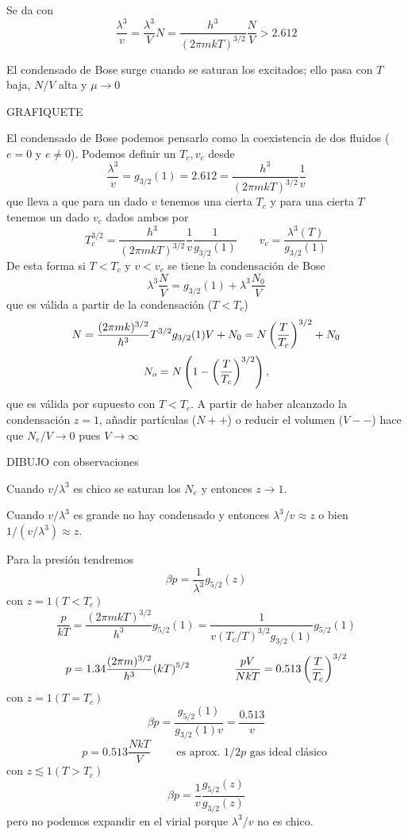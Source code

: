 \documentclass[10pt,oneside]{CBFT_book}
\begin{document}
Se da con 
\[
	\frac{\lambda^3}{v} = \frac{\lambda^3}{V} N = \frac{h^3}{(2\pi m kT)^{3/2}} \frac{N}{V} > 2.612
\]

El condensado de Bose surge cuando se saturan los excitados; ello pasa con $T$ baja, $N/V$
alta y $ \mu \to 0$

GRAFIQUETE

El condensado de Bose podemos pensarlo como la coexistencia de dos fluidos ($e=0$ y $e\neq 0$).
Podemos definir un $ T_c, v_c $ desde 
\[
	\frac{\lambda^3}{v} = g_{3/2}(1) = 2.612 = \frac{h^3}{(2 \pi m k T)^{3/2}} \frac{1}{v}
\]
que lleva a que para un dado $v$ tenemos una cierta $T_c$ y para una cierta $T$ tenemos un 
dado $v_c$ dados ambos por 
\[
	T_c^{3/2} = \frac{h^3}{(2 \pi m k T)^{3/2}} \frac{1}{v} \frac{1}{g_{3/2}(1)} \qquad 
	v_c = \frac{\lambda^3(T)}{g_{3/2}(1)}
\]
De esta forma si $ T<T_c$ y $v<v_c$ se tiene la condensación de Bose
\[
	\lambda^3\frac{N}{V} = g_{3/2}(1) + \lambda^3\frac{N_0}{V}
\]
que es válida a partir de la condensación ($T<T_c$)
\[
	N =  \frac{(2 \pi m k )^{3/2}}{h^3} T^{3/2} g_{3/2}(1)  V + N_0 = N \left( \frac{ T }{ T_c } \right)^{3/2} + N_0
\]
\[
	N_o = N \left( 1 - \left( \frac{ T }{ T_c } \right)^{3/2} \right),
\]
que es válida por supuesto con $T<T_c$.
A partir de haber alcanzado la condensación $z=1$, añadir partículas ($N++$) o reducir el volumen 
($V--$) hace que $N_e/V \to 0 $ pues $V \to \infty$

DIBUJO con observaciones

Cuando $v/\lambda^3$ es chico se saturan los $N_e$ y entonces $ z \to 1 $.

Cuando $v/\lambda^3$ es grande no hay condensado y entonces $ \lambda^3/v \approx z $ o bien
$ 1/ (v/\lambda^3) \approx z $.

Para la presión tendremos
\[
	\beta p = \frac{1}{\lambda^3} g_{5/2}(z)
\]
con $ z = 1 ( T < T_c ) $
\[
	\frac{p}{kT} = \frac{(2\pi m k T)^{3/2}}{h^3} g_{5/2}(1) = 
	\frac{1}{ v (T_c/T)^{3/2} g_{3/2}(1) } g_{5/2}(1)
\]
\[
	p = 1.34 \frac{(2\pi m )^{3/2}}{h^3} (kT)^{5/2} \qquad \qquad 
	\frac{pV}{NkT} = 0.513 \left( \frac{ T }{ T_c } \right)^{3/2}
\]
con $ z = 1 ( T = T_c ) $
\[
	\beta p = \frac{ g_{5/2}(1) }{ g_{3/2}(1) v } = \frac{0.513}{v}
\]
\[
	p = 0.513 \frac{NkT}{V} \qquad \text{ es aprox. $1/2 p$ gas ideal clásico }
\]
con $ z \lesssim 1 ( T > T_c ) $
\[
	\beta p = \frac{1}{v} \frac{ g_{5/2}(z) }{ g_{3/2}(z) }
\]
pero no podemos expandir en el virial porque $ \lambda^3 / v $ no es chico.
\end{document}
